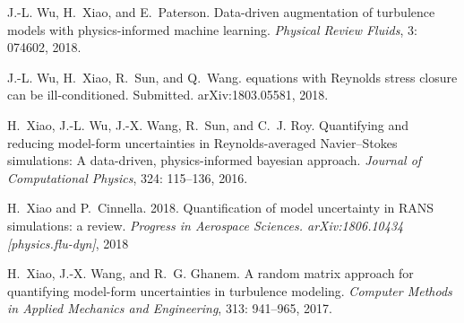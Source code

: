 \documentclass[a4paper]{ar-1col}
\begin{document}
\begin{thebibliography}{82}
J.-L. Wu, H.~Xiao, and E.~Paterson.
\newblock Data-driven augmentation of turbulence models with physics-informed
  machine learning.
\newblock \emph{Physical Review Fluids}, 3: 074602, 2018{}.

J.-L. Wu, H.~Xiao, R.~Sun, and Q.~Wang.
 equations with {Reynolds} stress closure can be
  ill-conditioned.
\newblock Submitted.  arXiv:1803.05581, 2018{}.

H.~Xiao, J.-L. Wu, J.-X. Wang, R.~Sun, and C.~J. Roy.
\newblock Quantifying and reducing model-form uncertainties in
  {Reynolds-averaged} {Navier--Stokes} simulations: A data-driven,
  physics-informed bayesian approach.
\newblock \emph{Journal of Computational Physics}, 324: 115--136,
  2016.

H.~Xiao and P.~Cinnella. 2018. 
\newblock Quantification of model uncertainty in RANS simulations: a review.
\newblock \emph{Progress in Aerospace Sciences. arXiv:1806.10434 [physics.flu-dyn]}, 2018


H.~Xiao, J.-X. Wang, and R.~G. Ghanem.
\newblock A random matrix approach for quantifying model-form uncertainties in
  turbulence modeling.
\newblock \emph{Computer Methods in Applied Mechanics and Engineering},
  313: 941--965, 2017.

\end{thebibliography}
\end{document}
